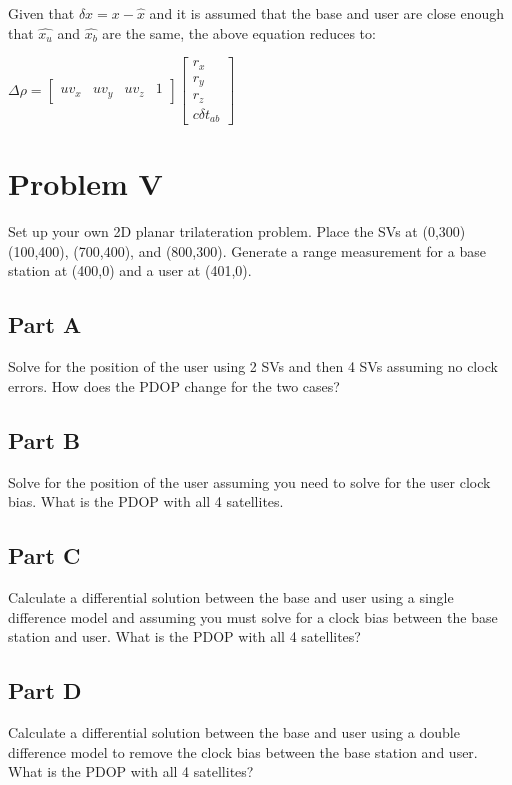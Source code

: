 \documentclass{article}
\begin{document}
Given that $\delta x = x - \hat{x}$ and it is assumed that the base and user are close enough that $\hat{x_u}$ and $\hat{x_b}$ are the same, the above equation reduces to:

\begin{center}
$\Delta\rho=\begin{bmatrix}
    uv_x & uv_y & uv_z & 1
    \end{bmatrix}\begin{bmatrix}
    r_x\\r_y\\r_z\\c\delta t_{ab}
    \end{bmatrix}$
\end{center}


\section*{Problem V}
Set up your own 2D planar trilateration problem. Place the SVs at (0,300) (100,400),
(700,400), and (800,300). Generate a range measurement for a base station at (400,0) and a
user at (401,0).

\subsection*{Part A}
Solve for the position of the user using 2 SVs and then 4 SVs assuming no clock
errors. How does the PDOP change for the two cases?

\subsection*{Part B}
Solve for the position of the user assuming you need to solve for the user clock bias.
What is the PDOP with all 4 satellites.

\subsection*{Part C}
Calculate a differential solution between the base and user using a single difference
model and assuming you must solve for a clock bias between the base station and
user. What is the PDOP with all 4 satellites?

\subsection*{Part D}
Calculate a differential solution between the base and user using a double difference
model to remove the clock bias between the base station and user. What is the PDOP
with all 4 satellites?
\end{document}
